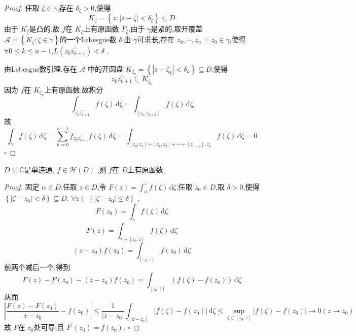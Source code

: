 \documentclass[../../复变函数.tex]{subfiles}
\begin{document}
\begin{proof}
    任取 \(  \zeta  \in  \gamma   \),存在 \(   \delta  _{\zeta }> 0  \),使得  \[
    K_{\zeta }= \left\{ z: \left| z-\zeta  \right|<  \delta  _{\zeta }  \right\}\subseteq D
    \]由于 \(  K_{\zeta }  \)是凸的,故 \(  f  \)在 \(  K_{\zeta }  \)上有原函数 \(  F_{\zeta }  \).由于 \(   \gamma   \)是紧的,取开覆盖 \(  \mathscr{A}= \left\{ K_{\zeta }:\zeta  \in  \gamma  \right\}  \)的一个Lebesgue数 \(   \delta    \).由 \(   \gamma   \)可求长,存在 \(   z_0,\cdots,z_{n}= z_0 \in  \gamma      \),使得 \(  \forall 0\le k\le n-1  \),\(  L\left(   \overset{\frown}{z_{k}z_{k+ 1}}\right)< \delta  \)    .

    由Lebesgue数引理,存在 \(  \mathscr{A}  \) 中的开圆盘 \(  K_{\zeta _{k}}= \left\{ \left| z-\zeta _{k} \right|<  \delta  _{k}  \right\}  \subseteq D\),使得 \[
        \overset{\frown}{z_{k}z_{k+ 1}}\subseteq  K_{\zeta _{k}}
    \] 因为 \(  f  \)在 \(  K_{\zeta _{k}}  \)上有原函数,故积分 \[
    \int_{ \overset{\frown}{z_{k}z_{k+ 1}}}f\left( \zeta  \right)\,\mathrm{d} \zeta = \int_{\left[ z_{k},z_{k+ 1} \right] }f\left( \zeta  \right)\,\mathrm{d} \zeta   
    \]  故 \[
    \int_{ \gamma }f\left( \zeta  \right) \,\mathrm{d} \zeta = \sum _{k= 0}^{n-1}f_{ \overset{\frown}{z_{k}z_{k+ 1}}}f\left( \zeta  \right)\,\mathrm{d} \zeta = \int_{[z_0,z_1]+ \left[ z_1,z_2 \right]+ \cdots + [z_{n-1}],z_{n} }f\left( \zeta  \right)\,\mathrm{d} \zeta   = 0
    \]
    \hfill $\square$
\end{proof}

\begin{theorem}
    \(  D\subseteq \mathbb{C}   \)是单连通, \(  f \in \mathcal{H}\left( D \right)   \)  ,则 \(  f  \)在 \(  D  \)上有原函数.   
\end{theorem}
\begin{proof}
    固定 \(  \alpha \in D  \),任取 \(  z \in D  \),令 \(  F\left( z \right)= \int_{ \alpha }^{z}f\left( \zeta  \right)\,\mathrm{d} \zeta     \).任取 \(  z_0 \in D  \),取 \(   \delta  >0  \),使得 \(  \left\{ \left| \zeta -z_0 \right|<  \delta    \right\}\subseteq D  \).      
    \(  \forall z \in \left\{ \left| \zeta -z_0 \right|\le  \delta    \right\}  \) ,\[
        F\left( z_0 \right)= \int_{ \gamma }f\left( \zeta  \right)\,\mathrm{d} \zeta   
    \]\[
        F\left( z \right)= \int_{ \gamma + \left[ z_0,z \right] }f\left( \zeta  \right)\,\mathrm{d} \zeta   
    \] \[
    \left( z-z_0 \right)f\left( z_0 \right)= \int_{\left[ z_0,z \right] }f\left( z_0 \right)\,\mathrm{d} \zeta    
    \] 前两个减后一个,得到 \[
    F\left( z \right)-F\left( z_0 \right)-\left( z-z_0 \right)f\left( z_0 \right)= \int_{\left[ z_0,z \right] }\left( f\left( \zeta  \right)-f\left( z_0 \right)   \right)\,\mathrm{d} \zeta      
    \]从而 \[
    \left| \frac{F\left( z \right)-F\left( z_0 \right)   }{z-z_0 }-f\left( z_0 \right)   \right|\le  \frac{1 }{\left| z-z_0 \right|  }\int_{\left[ z-z_0 \right] }\left| f\left( \zeta  \right)-f\left( z_0 \right)   \right|\,\mathrm{d} \zeta \le \sup _{\zeta \in \left[ z_0,z \right] }\left| f\left( \zeta  \right)-f\left( z_0 \right)   \right|\to 0\left( z\to z_0 \right)      
    \]故 \(  F  \)在 \(  z_0  \)处可导,且 \(  F^{\prime} \left( z_0 \right)= f\left( z_0 \right)    \).   
    \hfill $\square$
\end{proof}
\end{document}
